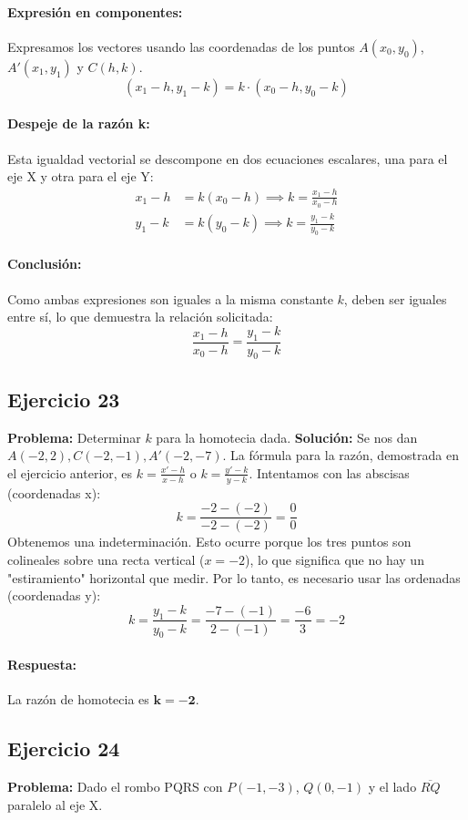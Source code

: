 \documentclass[12pt, letterpaper]{article}
\begin{document}
\paragraph{Expresión en componentes:} Expresamos los vectores usando las coordenadas de los puntos $A(x_0,y_0)$, $A'(x_1,y_1)$ y $C(h,k)$.
\[ (x_1 - h, y_1 - k) = k \cdot (x_0 - h, y_0 - k) \]
\paragraph{Despeje de la razón k:} Esta igualdad vectorial se descompone en dos ecuaciones escalares, una para el eje X y otra para el eje Y:
\begin{align*}
	x_1 - h & = k(x_0 - h) \implies k = \frac{x_1 - h}{x_0 - h} \\
	y_1 - k & = k(y_0 - k) \implies k = \frac{y_1 - k}{y_0 - k}
\end{align*}
\paragraph{Conclusión:} Como ambas expresiones son iguales a la misma constante $k$, deben ser iguales entre sí, lo que demuestra la relación solicitada:
\[ \frac{x_1 - h}{x_0 - h} = \frac{y_1 - k}{y_0 - k} \]

\subsection{Ejercicio 23}
\textbf{Problema:} Determinar $k$ para la homotecia dada.
\textbf{Solución:} Se nos dan $A(-2,2), C(-2,-1), A'(-2,-7)$. La fórmula para la razón, demostrada en el ejercicio anterior, es $k = \frac{x'-h}{x-h}$ o $k = \frac{y'-k}{y-k}$.
Intentamos con las abscisas (coordenadas x):
\[ k = \frac{-2 - (-2)}{-2 - (-2)} = \frac{0}{0} \]
Obtenemos una indeterminación. Esto ocurre porque los tres puntos son colineales sobre una recta vertical ($x=-2$), lo que significa que no hay un "estiramiento" horizontal que medir. Por lo tanto, es necesario usar las ordenadas (coordenadas y):
\[ k = \frac{y_1 - k}{y_0 - k} = \frac{-7 - (-1)}{2 - (-1)} = \frac{-6}{3} = -2 \]
\paragraph{Respuesta:} La razón de homotecia es $\mathbf{k=-2}$.

\subsection{Ejercicio 24}
\textbf{Problema:} Dado el rombo PQRS con $P(-1,-3)$, $Q(0,-1)$ y el lado $\overline{RQ}$ paralelo al eje X.
\end{document}
